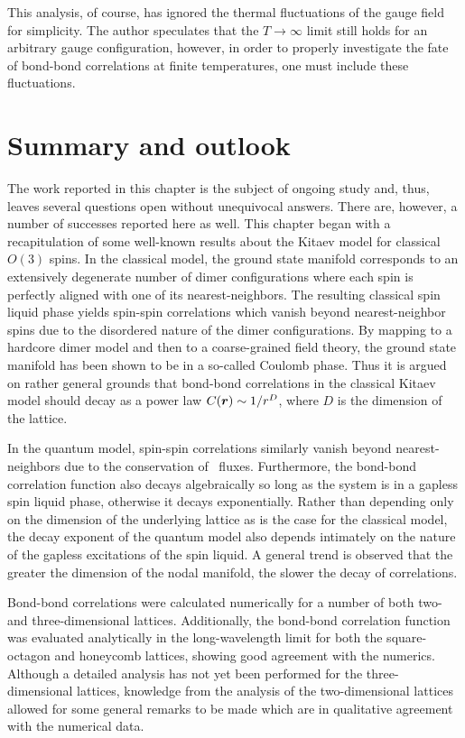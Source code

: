 This analysis, of course, has ignored the thermal fluctuations of the gauge field for simplicity.
The author speculates that the $T \rightarrow \infty$ limit still holds for an arbitrary gauge configuration, however, in order to properly investigate the fate of bond-bond correlations at finite temperatures, one must include these fluctuations.


%
%
\section{Summary and outlook}
\label{section:chapter07_Summary}
%
%
The work reported in this chapter is the subject of ongoing study and, thus, leaves several questions open without unequivocal answers.
There are, however, a number of successes reported here as well.
This chapter began with a recapitulation of some well-known results about the Kitaev model for classical $O(3)$ spins.
In the classical model, the ground state manifold corresponds to an extensively degenerate number of dimer configurations where each spin is perfectly aligned with one of its nearest-neighbors.
The resulting classical spin liquid phase yields spin-spin correlations which vanish beyond nearest-neighbor spins due to the disordered nature of the dimer configurations.
By mapping to a hardcore dimer model and then to a coarse-grained field theory, the ground state manifold has been shown to be in a so-called Coulomb phase.
Thus it is argued on rather general grounds that bond-bond correlations in the classical Kitaev model should decay as a power law $C(\bm{r}) \sim 1/r^D$, where $D$ is the dimension of the lattice.

In the quantum model, spin-spin correlations similarly vanish beyond nearest-neighbors due to the conservation of \ZZ~fluxes.
Furthermore, the bond-bond correlation function also decays algebraically so long as the system is in a gapless spin liquid phase, otherwise it decays exponentially.
Rather than depending only on the dimension of the underlying lattice as is the case for the classical model, the decay exponent of the quantum model also depends intimately on the nature of the gapless excitations of the spin liquid.
A general trend is observed that the greater the dimension of the nodal manifold, the slower the decay of correlations.

Bond-bond correlations were calculated numerically for a number of both two- and three-dimensional lattices.
Additionally, the bond-bond correlation function was evaluated analytically in the long-wavelength limit for both the square-octagon and honeycomb lattices, showing good agreement with the numerics.
Although a detailed analysis has not yet been performed for the three-dimensional lattices, knowledge from the analysis of the two-dimensional lattices allowed for some general remarks to be made which are in qualitative agreement with the numerical data.